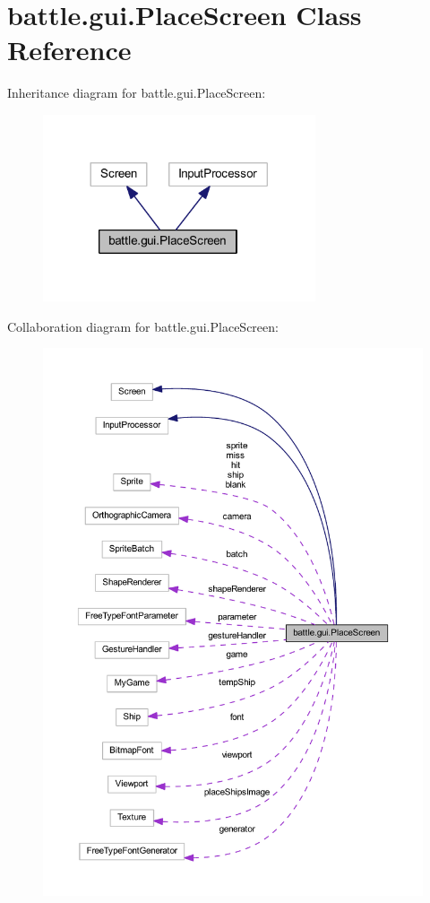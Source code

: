 \hypertarget{classbattle_1_1gui_1_1_place_screen}{}\section{battle.\+gui.\+Place\+Screen Class Reference}
\label{classbattle_1_1gui_1_1_place_screen}


Inheritance diagram for battle.\+gui.\+Place\+Screen\+:
\nopagebreak
\begin{figure}[H]
\begin{center}
\leavevmode
\includegraphics[width=228pt]{classbattle_1_1gui_1_1_place_screen__inherit__graph}
\end{center}
\end{figure}


Collaboration diagram for battle.\+gui.\+Place\+Screen\+:
\nopagebreak
\begin{figure}[H]
\begin{center}
\leavevmode
\includegraphics[width=350pt]{classbattle_1_1gui_1_1_place_screen__coll__graph}
\end{center}
\end{figure}
